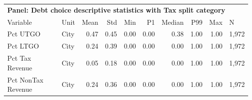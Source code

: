 \begin{table}[H]
\centering
\begin{tabular*}{\textwidth}{@{\extracolsep{\fill}}llrrrrrrrl}
\multicolumn{10}{l}{\textbf{Panel: Debt choice descriptive statistics with Tax split category}}\\

\addlinespace
  \toprule
Variable & Unit & Mean & Std & Min & P1 & Median & P99 & Max & N \\ 
  \hline
Pct UTGO & City & 0.47 & 0.45 & 0.00 & 0.00 & 0.38 & 1.00 & 1.00 & 1,972 \\ 
  Pct LTGO & City & 0.24 & 0.39 & 0.00 & 0.00 & 0.00 & 1.00 & 1.00 & 1,972 \\ 
  Pct Tax Revenue & City & 0.05 & 0.18 & 0.00 & 0.00 & 0.00 & 1.00 & 1.00 & 1,972 \\ 
  Pct NonTax Revenue & City & 0.24 & 0.36 & 0.00 & 0.00 & 0.00 & 1.00 & 1.00 & 1,972 \\ 
   \hline
\end{tabular*}
\end{table}
